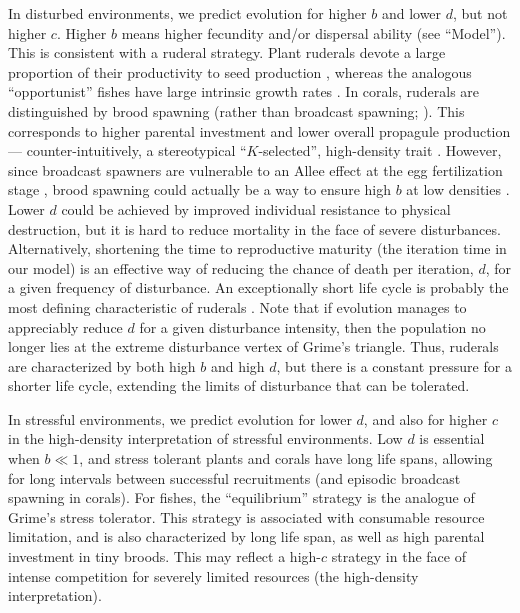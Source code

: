 \documentclass[11pt]{article}
\begin{document}
In disturbed environments, we predict evolution for higher $b$ and lower $d$, but not higher $c$. Higher $b$ means higher fecundity and/or dispersal ability (see ``Model''). This is consistent with a ruderal strategy. Plant ruderals devote a large proportion of their productivity to seed production \citep{grime_1977}, whereas the analogous ``opportunist'' fishes have large intrinsic growth rates \citep{winemiller_1992}. In corals, ruderals are distinguished by brood spawning (rather than broadcast spawning; \citealt{darling_2012}). This corresponds to higher parental investment and lower overall propagule production --- counter-intuitively, a stereotypical ``$K$-selected'', high-density trait \citep{pianka_1970}. However, since broadcast spawners are vulnerable to an Allee effect at the egg fertilization stage \citep{knowlton_2001}, brood spawning could actually be a way to ensure high $b$ at low densities \citep{darling_2012}. Lower $d$ could be achieved by improved individual resistance to physical destruction, but it is hard to reduce mortality in the face of severe disturbances. Alternatively, shortening the time to reproductive maturity (the iteration time in our model) is an effective way of reducing the chance of death per iteration, $d$, for a given frequency of disturbance. An exceptionally short life cycle is probably the most defining characteristic of ruderals \citep{grime_1977,winemiller_1992,darling_2012}. Note that if evolution manages to appreciably reduce $d$ for a given disturbance intensity, then the population no longer lies at the extreme disturbance vertex of Grime's triangle. Thus, ruderals are characterized by both high $b$ and high $d$, but there is a constant pressure for a shorter life cycle, extending the limits of disturbance that can be tolerated. 

In stressful environments, we predict evolution for lower $d$, and also  for higher $c$ in the high-density interpretation of stressful environments. Low $d$ is essential when $b\ll 1$, and stress tolerant plants and corals have long life spans, allowing for long intervals between successful recruitments (and episodic broadcast spawning in corals). For fishes, the ``equilibrium'' strategy is the analogue of Grime's stress tolerator. This strategy is associated with consumable resource limitation, and is also characterized by long life span, as well as high parental investment in tiny broods. This may reflect a high-$c$ strategy in the face of intense competition for severely limited resources (the high-density interpretation).
\end{document}
